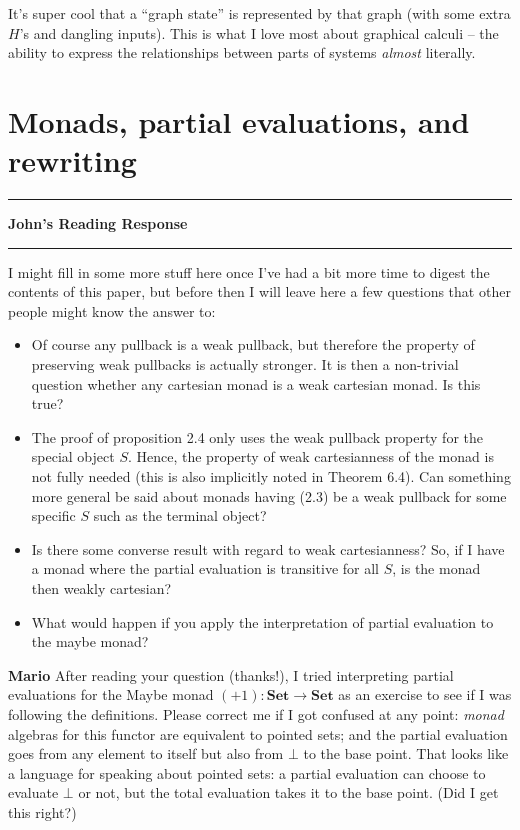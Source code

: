\documentclass{amsart}
\newcommand{\iam}[1]{
  \vspace{0.25em}
  \hrule
  \vspace{0.25em}
  \textbf{{#1}'s Reading Response}
  \vspace{0.25em}
  \hrule
  \vspace{1em}
}
\newcommand{\respond}[1]{
  \vspace{1em} \textbf{#1}
}
\begin{document}
It's super cool that a ``graph state'' is represented by that graph (with some extra $H$'s and dangling inputs). This is what I love most about graphical calculi -- the ability to express the relationships between parts of systems \emph{almost} literally.



\section{Monads, partial evaluations, and rewriting}
\label{sec:monads}

\iam{John}

I might fill in some more stuff here once I've had a bit more time to digest the contents of this paper, but before then I will leave here a few questions that other people might know the answer to:
\begin{itemize}
  \item Of course any pullback is a weak pullback, but therefore the property of preserving weak pullbacks is actually stronger. It is then a non-trivial question whether any cartesian monad is a weak cartesian monad. Is this true?
  \item The proof of proposition 2.4 only uses the weak pullback property for the special object $S$. Hence, the property of weak cartesianness of the monad is not fully needed (this is also implicitly noted in Theorem 6.4). Can something more general be said about monads having (2.3) be a weak pullback for some specific $S$ such as the terminal object?
  \item Is there some converse result with regard to weak cartesianness? So, if I have a monad where the partial evaluation is transitive for all $S$, is the monad then weakly cartesian?
  \item What would happen if you apply the interpretation of partial evaluation to the maybe monad?
\end{itemize}

\respond{Mario} After reading your question (thanks!), I tried
interpreting partial evaluations for the Maybe monad
$(+1) \colon \mathbf{Set} \to \mathbf{Set}$ as an exercise to see if I
was following the definitions. Please correct me if I got confused at
any point: \textit{monad} algebras for this functor are equivalent to
pointed sets; and the partial evaluation goes from any element to
itself but also from $\bot$ to the base point. That looks like a
language for speaking about pointed sets: a partial evaluation can
choose to evaluate $\bot$ or not, but the total evaluation takes
it to the base point. (Did I get this right?)
\end{document}
